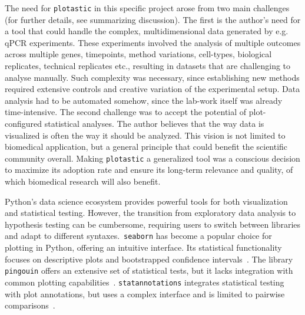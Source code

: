 The need for \texttt{plotastic} in this specific project arose from two main
challenges (for further details, see summarizing discussion). The first is the
author's need for a tool that could handle the complex, multidimensional data
generated by e.g. qPCR experiments. These experiments involved the analysis of
multiple outcomes across multiple genes, timepoints, method variations,
cell-types, biological replicates, technical replicates etc., resulting in
datasets that are challenging to analyse manually. Such complexity was
necessary, since establishing new methods required extensive controls and
creative variation of the experimental setup. Data analysis had to be automated
somehow, since the lab-work itself was already time-intensive. The second
challenge was to accept the potential of plot-configured statistical analyses.
The author believes that the way data is visualized is often the way it should
be analyzed. This vision is not limited to biomedical application, but a general
principle that could benefit the scientific community overall. Making
\texttt{plotastic} a generalized tool was a conscious decision to maximize its
adoption rate and ensure its long-term relevance and quality, of which biomedical
research will also benefit.













%
\label{sec:C2_need}%
Python's data science ecosystem provides powerful tools for both visualization
and statistical testing. However, the transition from exploratory data analysis
to hypothesis testing can be cumbersome, requiring users to switch between
libraries and adapt to different syntaxes.~\texttt{seaborn} has become a popular
choice for plotting in Python, offering an intuitive interface. Its statistical
functionality focuses on descriptive plots and bootstrapped confidence
intervals~\cite{waskomSeabornStatisticalData2021}. The library \texttt{pingouin}
offers an extensive set of statistical tests, but it lacks integration with
common plotting capabilities~\cite{vallatPingouinStatisticsPython2018}.
\texttt{statannotations} integrates statistical testing with plot annotations,
but uses a complex interface and is limited to pairwise
comparisons~\cite{charlierTrevismdStatannotationsV02022}.

